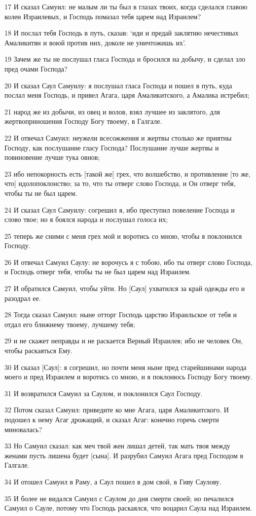 \par 17 И сказал Самуил: не малым ли ты был в глазах твоих, когда сделался главою колен Израилевых, и Господь помазал тебя царем над Израилем?
\par 18 И послал тебя Господь в путь, сказав: `иди и предай заклятию нечестивых Амаликитян и воюй против них, доколе не уничтожишь их'.
\par 19 Зачем же ты не послушал гласа Господа и бросился на добычу, и сделал зло пред очами Господа?
\par 20 И сказал Саул Самуилу: я послушал гласа Господа и пошел в путь, куда послал меня Господь, и привел Агага, царя Амаликитского, а Амалика истребил;
\par 21 народ же из добычи, из овец и волов, взял лучшее из заклятого, для жертвоприношения Господу Богу твоему, в Галгале.
\par 22 И отвечал Самуил: неужели всесожжения и жертвы столько же приятны Господу, как послушание гласу Господа? Послушание лучше жертвы и повиновение лучше тука овнов;
\par 23 ибо непокорность есть [такой же] грех, что волшебство, и противление [то же, что] идолопоклонство; за то, что ты отверг слово Господа, и Он отверг тебя, чтобы ты не был царем.
\par 24 И сказал Саул Самуилу: согрешил я, ибо преступил повеление Господа и слово твое; но я боялся народа и послушал голоса их;
\par 25 теперь же сними с меня грех мой и воротись со мною, чтобы я поклонился Господу.
\par 26 И отвечал Самуил Саулу: не ворочусь я с тобою, ибо ты отверг слово Господа, и Господь отверг тебя, чтобы ты не был царем над Израилем.
\par 27 И обратился Самуил, чтобы уйти. Но [Саул] ухватился за край одежды его и разодрал ее.
\par 28 Тогда сказал Самуил: ныне отторг Господь царство Израильское от тебя и отдал его ближнему твоему, лучшему тебя;
\par 29 и не скажет неправды и не раскается Верный Израилев; ибо не человек Он, чтобы раскаяться Ему.
\par 30 И сказал [Саул]: я согрешил, но почти меня ныне пред старейшинами народа моего и пред Израилем и воротись со мною, и я поклонюсь Господу Богу твоему.
\par 31 И возвратился Самуил за Саулом, и поклонился Саул Господу.
\par 32 Потом сказал Самуил: приведите ко мне Агага, царя Амаликитского. И подошел к нему Агаг дрожащий, и сказал Агаг: конечно горечь смерти миновалась?
\par 33 Но Самуил сказал: как меч твой жен лишал детей, так мать твоя между женами пусть лишена будет [сына]. И разрубил Самуил Агага пред Господом в Галгале.
\par 34 И отошел Самуил в Раму, а Саул пошел в дом свой, в Гиву Саулову.
\par 35 И более не видался Самуил с Саулом до дня смерти своей; но печалился Самуил о Сауле, потому что Господь раскаялся, что воцарил Саула над Израилем.

